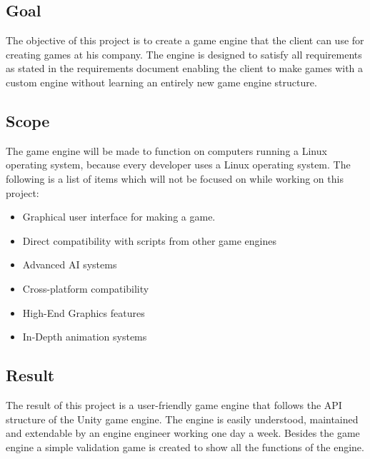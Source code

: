 \documentclass{article} %
\begin{document}
\subsection{Goal}
The objective of this project is to create a game engine that the client can use for creating games at his company.
The engine is designed to satisfy all requirements as stated in the requirements document enabling the client to make games with a custom engine without learning an entirely new game engine structure.

\subsection{Scope}
The game engine will be made to function on computers running a Linux operating system, because every developer uses a Linux operating system.
\newline\newline
The following is a list of items which will not be focused on while working on this project:
\begin{itemize}
    \item Graphical user interface for making a game.
    \item Direct compatibility with scripts from other game engines
    \item Advanced AI systems
    \item Cross-platform compatibility
    \item High-End Graphics features
    \item In-Depth animation systems
\end{itemize}

\subsection{Result}
The result of this project is a user-friendly game engine that follows the API structure of the Unity game engine.
The engine is easily understood, maintained and extendable by an engine engineer working one day a week.
\newline\newline
Besides the game engine a simple validation game is created to show all the functions of the engine.
\newpage
\end{document}
